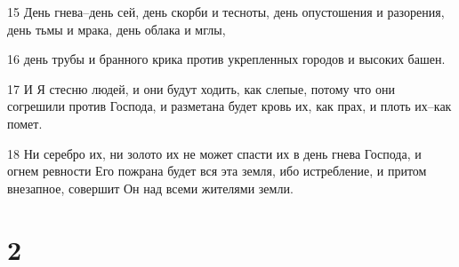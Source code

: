 \par 15 День гнева--день сей, день скорби и тесноты, день опустошения и разорения, день тьмы и мрака, день облака и мглы,
\par 16 день трубы и бранного крика против укрепленных городов и высоких башен.
\par 17 И Я стесню людей, и они будут ходить, как слепые, потому что они согрешили против Господа, и разметана будет кровь их, как прах, и плоть их--как помет.
\par 18 Ни серебро их, ни золото их не может спасти их в день гнева Господа, и огнем ревности Его пожрана будет вся эта земля, ибо истребление, и притом внезапное, совершит Он над всеми жителями земли.

\chapter{2}

